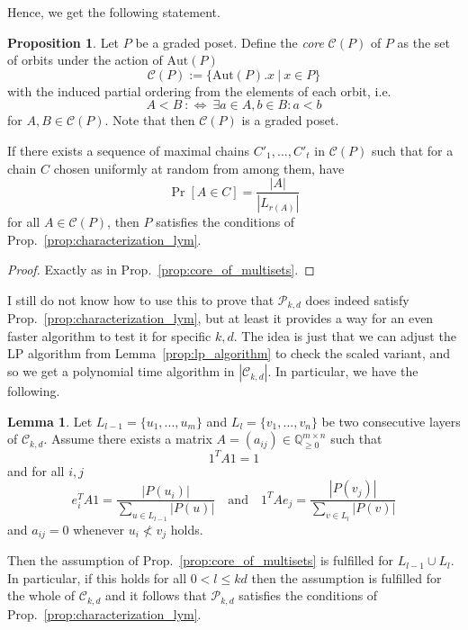 \documentclass{scrartcl}
\newcommand{\Q}{\mathbb{Q}}
\theoremstyle{definition}
\newtheorem{lemma}[definition]{Lemma}
\newtheorem{proposition}[definition]{Proposition}
\begin{document}
Hence, we get the following statement.
\begin{proposition}
    Let $P$ be a graded poset. Define the \emph{core} $\mathcal{C}(P)$ of $P$ as the set of orbits under the action of $\mathrm{Aut}(P)$ 
    \begin{equation*}
        \mathcal{C}(P) := \{ \mathrm{Aut}(P).x \ | \ x \in P \}
    \end{equation*}
    with the induced partial ordering from the elements of each orbit, i.e.
    \begin{equation*}
        A < B \ :\Leftrightarrow \ \exists a \in A, b \in B: a < b
    \end{equation*}
    for $A, B \in \mathcal{C}(P)$.
    Note that then $\mathcal{C}(P)$ is a graded poset.
    
    If there exists a sequence of maximal chains $C'_1, ..., C'_t$ in $\mathcal{C}(P)$ such that for a chain $C$ chosen uniformly at random from among them, have
    \begin{equation*}
        \Pr[A \in C] = \frac {|A|} {|L_{r(A)}|}
    \end{equation*}
    for all $A \in \mathcal{C}(P)$, then $P$ satisfies the conditions of Prop.~\ref{prop:characterization_lym}.
\end{proposition}
\begin{proof}
    Exactly as in Prop.~\ref{prop:core_of_multisets}.
\end{proof}
I still do not know how to use this to prove that $\mathcal{P}_{k, d}$ does indeed satisfy Prop.~\ref{prop:characterization_lym}, but at least it provides a way for an even faster algorithm to test it for specific $k, d$.
The idea is just that we can adjust the LP algorithm from Lemma~\ref{prop:lp_algorithm} to check the scaled variant, and so we get a polynomial time algorithm in $|\mathcal{C}_{k, d}|$.
In particular, we have the following.
\begin{lemma}
    Let $L_{l - 1} = \{u_1, ..., u_m\}$ and $L_l = \{v_1, ..., v_n\}$ be two consecutive layers of $\mathcal{C}_{k, d}$.
    Assume there exists a matrix $A = (a_{ij}) \in \Q_{\geq 0}^{m \times n}$ such that 
    \begin{equation*}
        1^T A 1 = 1
    \end{equation*}
    and for all $i, j$
    \begin{equation*}
        e_i^T A 1 = \frac {|P(u_i)|} {\sum_{u \in L_{l - 1}} |P(u)|} \quad \text{and} \quad 1^T A e_j = \frac {|P(v_j)|} {\sum_{v \in L_l} |P(v)|}
    \end{equation*}
    and $a_{ij} = 0$ whenever $u_i \not< v_j$ holds.

    Then the assumption of Prop.~\ref{prop:core_of_multisets} is fulfilled for $L_{l - 1} \cup L_l$.
    In particular, if this holds for all $0 < l \leq kd$ then the assumption is fulfilled for the whole of $\mathcal{C}_{k, d}$ and it follows that $\mathcal{P}_{k, d}$ satisfies the conditions of Prop.~\ref{prop:characterization_lym}.
\end{lemma}
\end{document}
